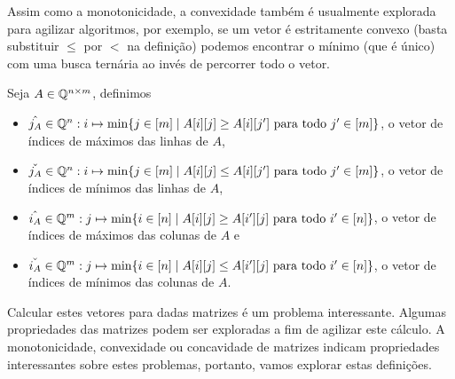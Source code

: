 Assim como a monotonicidade, a convexidade também é usualmente explorada para agilizar algoritmos, por exemplo, se um vetor é estritamente convexo (basta substituir $\leq$ por $<$ na definição) podemos encontrar o mínimo (que é único) com uma busca ternária ao invés de percorrer todo o vetor.  

\begin{defi}
Seja $A \in \mathbb{Q}^{n \times m}$, definimos
    \begin{itemize}
        \item $\hat{j_A} \in \mathbb{Q}^n : i \mapsto \min\{j \in [m] \mid A[i][j] \geq A[i][j'] \text{ para todo } j' \in [m]\}$, o vetor de índices de máximos das linhas de $A$,
        \item $\check{j_A} \in \mathbb{Q}^n : i \mapsto \min\{j \in [m] \mid A[i][j] \leq A[i][j'] \text{ para todo } j' \in [m]\}$, o vetor de índices de mínimos das linhas de $A$,
        \item $\hat{i_A} \in \mathbb{Q}^m : j \mapsto \min\{i \in [n] \mid A[i][j] \geq A[i'][j] \text{ para todo } i' \in [n]\}$, o vetor de índices de máximos das colunas de $A$ e 
        \item $\check{i_A} \in \mathbb{Q}^m : j \mapsto \min\{i \in [n] \mid A[i][j] \leq A[i'][j] \text{ para todo } i' \in [n]\}$, o vetor de índices de mínimos das colunas de $A$.
    \end{itemize}
\end{defi}

Calcular estes vetores para dadas matrizes é um problema interessante. Algumas propriedades das matrizes podem ser exploradas a fim de agilizar este cálculo. A monotonicidade, convexidade ou concavidade de matrizes indicam propriedades interessantes sobre estes problemas, portanto, vamos explorar estas definições.

